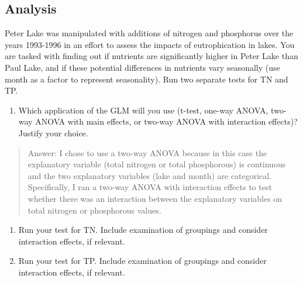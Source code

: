 \documentclass[]{article}
\newenvironment{Shaded}{\begin{snugshade}}{\end{snugshade}}
\newcommand{\CommentTok}[1]{\textcolor[rgb]{0.56,0.35,0.01}{\textit{#1}}}
\newcommand{\DataTypeTok}[1]{\textcolor[rgb]{0.13,0.29,0.53}{#1}}
\newcommand{\FloatTok}[1]{\textcolor[rgb]{0.00,0.00,0.81}{#1}}
\newcommand{\KeywordTok}[1]{\textcolor[rgb]{0.13,0.29,0.53}{\textbf{#1}}}
\newcommand{\NormalTok}[1]{#1}
\newcommand{\OperatorTok}[1]{\textcolor[rgb]{0.81,0.36,0.00}{\textbf{#1}}}
\newcommand{\StringTok}[1]{\textcolor[rgb]{0.31,0.60,0.02}{#1}}
\providecommand{\tightlist}{%
  \setlength{\itemsep}{0pt}\setlength{\parskip}{0pt}}
\begin{document}
\hypertarget{analysis}{%
\subsection{Analysis}\label{analysis}}

Peter Lake was manipulated with additions of nitrogen and phosphorus
over the years 1993-1996 in an effort to assess the impacts of
eutrophication in lakes. You are tasked with finding out if nutrients
are significantly higher in Peter Lake than Paul Lake, and if these
potential differences in nutrients vary seasonally (use month as a
factor to represent seasonality). Run two separate tests for TN and TP.

\begin{enumerate}
\def\labelenumi{\arabic{enumi}.}
\setcounter{enumi}{3}
\tightlist
\item
  Which application of the GLM will you use (t-test, one-way ANOVA,
  two-way ANOVA with main effects, or two-way ANOVA with interaction
  effects)? Justify your choice.
\end{enumerate}

\begin{quote}
Answer: I chose to use a two-way ANOVA because in this case the
explanatory variable (total nitrogen or total phosphorous) is continuous
and the two explanatory variables (lake and month) are categorical.
Specifically, I ran a two-way ANOVA with interaction effects to test
whether there was an interaction between the explanatory variables on
total nitrogen or phosphorous values.
\end{quote}

\begin{enumerate}
\def\labelenumi{\arabic{enumi}.}
\setcounter{enumi}{4}
\item
  Run your test for TN. Include examination of groupings and consider
  interaction effects, if relevant.
\item
  Run your test for TP. Include examination of groupings and consider
  interaction effects, if relevant.
\end{enumerate}

\begin{Shaded}
\end{Shaded}
\end{document}
